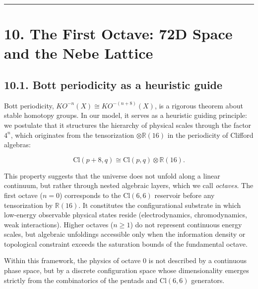 \documentclass[11pt]{article}
\begin{document}
\begin{center}\rule{0.5\linewidth}{0.5pt}\end{center}

\hypertarget{the-first-octave-72d-space-and-the-nebe-lattice}{%
\section{10. The First Octave: 72D Space and the Nebe
Lattice}\label{the-first-octave-72d-space-and-the-nebe-lattice}}

\hypertarget{bott-periodicity-as-a-heuristic-guide}{%
\subsection{10.1. Bott periodicity as a heuristic
guide}\label{bott-periodicity-as-a-heuristic-guide}}

Bott periodicity, \(KO^{-n}(X) \cong KO^{-(n+8)}(X)\), is a rigorous
theorem about stable homotopy groups. In our model, it serves as a
heuristic guiding principle: we postulate that it structures the
hierarchy of physical scales through the factor \(4^n\), which
originates from the tensorization \(\otimes \mathbb{R}(16)\) in the
periodicity of Clifford algebras:

\[
\mathrm{Cl}(p+8, q) \cong \mathrm{Cl}(p, q) \otimes \mathbb{R}(16).
\]

This property suggests that the universe does not unfold along a linear
continuum, but rather through nested algebraic layers, which we call
\emph{octaves}. The first octave (\(n=0\)) corresponds to the
\(\mathrm{Cl}(6,6)\) reservoir before any tensorization by
\(\mathbb{R}(16)\). It constitutes the configurational substrate in
which low-energy observable physical states reside (electrodynamics,
chromodynamics, weak interactions). Higher octaves (\(n \ge 1\)) do not
represent continuous energy scales, but algebraic unfoldings accessible
only when the information density or topological constraint exceeds the
saturation bounds of the fundamental octave.

Within this framework, the physics of octave \(0\) is not described by a
continuous phase space, but by a discrete configuration space whose
dimensionality emerges strictly from the combinatorics of the pentads
and \(\mathrm{Cl}(6,6)\) generators.
\end{document}
